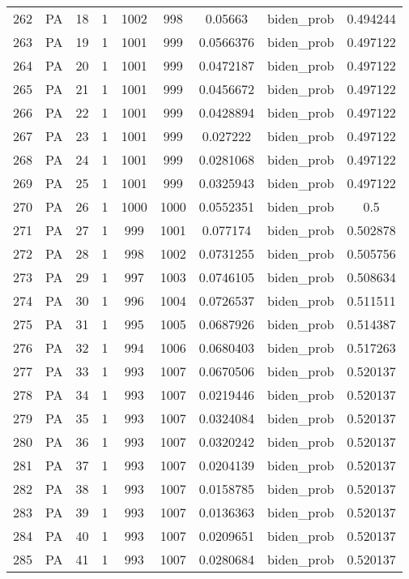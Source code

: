 \documentclass[12pt,a4paper]{article}
\begin{document}
\begin{tabular}{r|cccccccc}
	262 & PA & 18 & 1 & 1002 & 998 & 0.05663 & biden\_prob & 0.494244 \\
	263 & PA & 19 & 1 & 1001 & 999 & 0.0566376 & biden\_prob & 0.497122 \\
	264 & PA & 20 & 1 & 1001 & 999 & 0.0472187 & biden\_prob & 0.497122 \\
	265 & PA & 21 & 1 & 1001 & 999 & 0.0456672 & biden\_prob & 0.497122 \\
	266 & PA & 22 & 1 & 1001 & 999 & 0.0428894 & biden\_prob & 0.497122 \\
	267 & PA & 23 & 1 & 1001 & 999 & 0.027222 & biden\_prob & 0.497122 \\
	268 & PA & 24 & 1 & 1001 & 999 & 0.0281068 & biden\_prob & 0.497122 \\
	269 & PA & 25 & 1 & 1001 & 999 & 0.0325943 & biden\_prob & 0.497122 \\
	270 & PA & 26 & 1 & 1000 & 1000 & 0.0552351 & biden\_prob & 0.5 \\
	271 & PA & 27 & 1 & 999 & 1001 & 0.077174 & biden\_prob & 0.502878 \\
	272 & PA & 28 & 1 & 998 & 1002 & 0.0731255 & biden\_prob & 0.505756 \\
	273 & PA & 29 & 1 & 997 & 1003 & 0.0746105 & biden\_prob & 0.508634 \\
	274 & PA & 30 & 1 & 996 & 1004 & 0.0726537 & biden\_prob & 0.511511 \\
	275 & PA & 31 & 1 & 995 & 1005 & 0.0687926 & biden\_prob & 0.514387 \\
	276 & PA & 32 & 1 & 994 & 1006 & 0.0680403 & biden\_prob & 0.517263 \\
	277 & PA & 33 & 1 & 993 & 1007 & 0.0670506 & biden\_prob & 0.520137 \\
	278 & PA & 34 & 1 & 993 & 1007 & 0.0219446 & biden\_prob & 0.520137 \\
	279 & PA & 35 & 1 & 993 & 1007 & 0.0324084 & biden\_prob & 0.520137 \\
	280 & PA & 36 & 1 & 993 & 1007 & 0.0320242 & biden\_prob & 0.520137 \\
	281 & PA & 37 & 1 & 993 & 1007 & 0.0204139 & biden\_prob & 0.520137 \\
	282 & PA & 38 & 1 & 993 & 1007 & 0.0158785 & biden\_prob & 0.520137 \\
	283 & PA & 39 & 1 & 993 & 1007 & 0.0136363 & biden\_prob & 0.520137 \\
	284 & PA & 40 & 1 & 993 & 1007 & 0.0209651 & biden\_prob & 0.520137 \\
	285 & PA & 41 & 1 & 993 & 1007 & 0.0280684 & biden\_prob & 0.520137 \\

\end{tabular}
\end{document}
